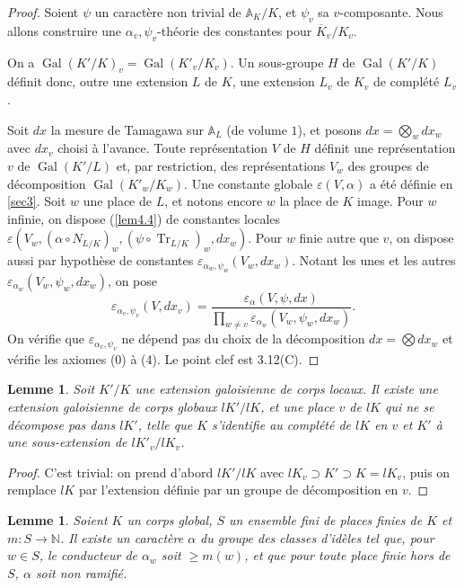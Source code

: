 \documentclass[11pt,a4paper]{amsart}
\theoremstyle{plain}
\newtheorem{lemma}[theorem]{Lemme}
\theoremstyle{definition}
\DeclareMathOperator{\Gal}{Gal}
\DeclareMathOperator{\Tr}{Tr}
\newcommand{\dbA}{\mathbb{A}}
\newcommand{\dbN}{\mathbb{N}}
\newcommand{\ov}[1]{\overline{#1}}
\newcommand{\eps}{\varepsilon}
\begin{document}
\begin{proof}
Soient $\psi$ un caract\`ere non trivial de $\dbA_{K}/K$, et $\psi_{v}$ sa $v$-composante. Nous allons construire une $\alpha_{v},\psi_{v}$-th\'eorie des constantes pour $\ov{K}_{v}/K_{v}$.

On a $\Gal(K'/K)_{v} = \Gal(K'_{v}/K_{v})$. Un sous-groupe $H$ de $\Gal(K'/K)$ d\'efinit donc, outre une extension $L$ de $K$, une extension $L_{v}$ de $K_{v}$ de compl\'et\'e $L_{v}$.

Soit $dx$ la mesure de Tamagawa sur $\dbA_{L}$ (de volume $1$), et posons $dx = \bigotimes_{w} dx_{w}$ avec $dx_{v}$ choisi \`a l'avance. Toute repr\'esentation $V$ de $H$ d\'efinit une repr\'esentation $v$ de $\Gal(K'/L)$ et, par restriction, des repr\'esentations $V_{w}$ des groupes de d\'ecomposition $\Gal(K'_{w}/K_{w})$. Une constante globale $\eps(V,\alpha)$ a \'et\'e d\'efinie en \ref{sec3}. Soit $w$ une place de $L$, et notons encore $w$ la place de $K$ image. Pour $w$ infinie, on dispose (\ref{lem4.4}) de constantes locales $\eps(V_{w}, (\alpha \circ N_{L/K})_{w}, (\psi \circ \Tr_{L/K})_{w}, dx_{w})$. Pour $w$ finie autre que $v$, on dispose aussi par hypoth\`ese de constantes $\eps_{\alpha_{w},\psi_{w}}(V_{w}, dx_{w})$. Notant les unes et les autres $\eps_{\alpha_{w}}(V_{w},\psi_{w},dx_{w})$, on pose
\[
\eps_{\alpha_{v},\psi_{v}}(V,dx_{v}) = \frac{\eps_{\alpha}(V,\psi,dx)}{\prod_{w \not= v} \eps_{\alpha_{w}}(V_{w},\psi_{w},dx_{w})}.
\]
On v\'erifie que $\eps_{\alpha_{v},\psi_{v}}$ ne d\'epend pas du choix de la d\'ecomposition $dx = \bigotimes dx_{w}$ et v\'erifie les axiomes (0) \`a (4). Le point clef est 3.12(C).
\end{proof}

\begin{lemma}\label{lem4.13}
Soit $K'/K$ une extension galoisienne de corps locaux. Il existe une extension galoisienne de corps globaux $lK'/lK$, et une place $v$ de $lK$ qui ne se d\'ecompose pas dans $lK'$, telle que $K$ s'identifie au compl\'et\'e de $lK$ en $v$ et $K'$ \`a une sous-extension de $lK'_{v}/lK_{v}$.
\end{lemma}

\begin{proof}
C'est trivial: on prend d'abord $lK'/lK$ avec $lK_{v} \supset K' \supset K = lK_{v}$, puis on remplace $lK$ par l'extension d\'efinie par un groupe de d\'ecomposition en $v$.
\end{proof}

\begin{lemma}\label{lem4.14}
Soient $K$ un corps global, $S$ un ensemble fini de places finies de $K$ et $m: S \to \dbN$. Il existe un caract\`ere $\alpha$ du groupe des classes d'id\`eles tel que, pour $w \in S$, le conducteur de $\alpha_{w}$ soit $\geq m(w)$, et que pour toute place finie hors de $S$, $\alpha$ soit non ramifi\'e.
\end{lemma}
\end{document}
